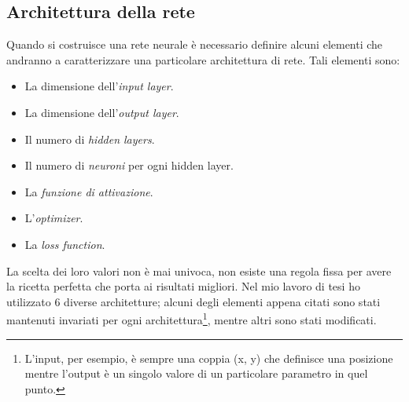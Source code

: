 \documentclass[12pt,a4paper,final]{book}
\begin{document}

\subsection{Architettura della rete}\label{architettura}
Quando si costruisce una rete neurale è necessario definire alcuni elementi che andranno a caratterizzare una particolare architettura di rete.
Tali elementi sono:
\begin{itemize}
	\item La dimensione dell'\textit{input layer}.
	\item La dimensione dell'\textit{output layer}.
	\item Il numero di \textit{hidden layers}.
	\item Il numero di \textit{neuroni} per ogni hidden layer.
	\item La \textit{funzione di attivazione}.
	\item L'\textit{optimizer}.
	\item La \textit{loss function}.
\end{itemize}
La scelta dei loro valori non è mai univoca, non esiste una regola fissa per avere la ricetta perfetta che porta ai risultati migliori.
Nel mio lavoro di tesi ho utilizzato 6 diverse architetture; alcuni degli elementi appena citati sono stati mantenuti invariati per ogni architettura\footnote{L'input, per esempio, è sempre una coppia (x, y) che definisce una posizione mentre l'output è un singolo valore di un particolare parametro in quel punto.}, mentre altri sono stati modificati.
\end{document}
